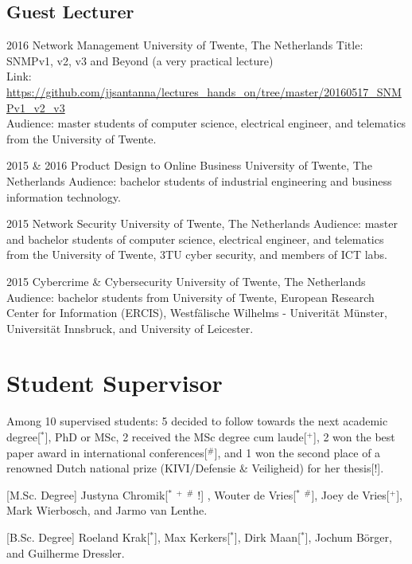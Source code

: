 \documentclass[print]{friggeri-cv} %
\begin{document}
\newpage
\subsection{Guest Lecturer}
\begin{entrylist}
\entry
{2016}
{Network Management}
{University of Twente, The Netherlands}
{Title: SNMPv1, v2, v3 and Beyond (a very practical lecture)\\
Link: \url{https://github.com/jjsantanna/lectures_hands_on/tree/master/20160517_SNMPv1_v2_v3}\\
Audience: master students of computer science, electrical engineer, and telematics from the University of Twente. }

\entry
{2015 \& 2016}
{Product Design to Online Business}
{University of Twente, The Netherlands}
{Audience: bachelor students of industrial engineering and business information technology.}

\entry
{2015}
{Network Security}
{University of Twente, The Netherlands}
{Audience: master and bachelor students of computer science, electrical engineer, and telematics from the University of Twente, 3TU cyber security, and members of ICT labs. }

\entry
{2015}
{Cybercrime \& Cybersecurity}
{University of Twente, The Netherlands}
{Audience: bachelor students from University of Twente, European Research Center for Information (ERCIS), Westfälische Wilhelms - Univerität Münster, Universität Innsbruck, and University of Leicester. }
\end{entrylist}

\section{Student Supervisor}
Among 10 supervised students: 5 decided to follow towards the next academic degree[$^*$], PhD or MSc, 2 received the MSc degree cum laude[$^+$], 2 won the best paper award in international conferences[$^\#$], and 1 won the second place of a renowned Dutch national prize (KIVI/Defensie \& Veiligheid) for her thesis[$!$].

\begin{entrylist}
\vspace{-0.3cm}
\entry
{[M.Sc. Degree]}
{Justyna Chromik[$^*$ $^+$ $^\#$ $!$] , Wouter de Vries[$^*$ $^\#$], Joey de Vries[$^+$], Mark Wierbosch, and Jarmo van Lenthe.}
{}

\vspace{-0.3cm}
\entry
{[B.Sc. Degree]}
{Roeland Krak[$^*$], Max Kerkers[$^*$], Dirk Maan[$^*$], Jochum Börger, and Guilherme Dressler.}
{}


\end{entrylist}
\end{document}
